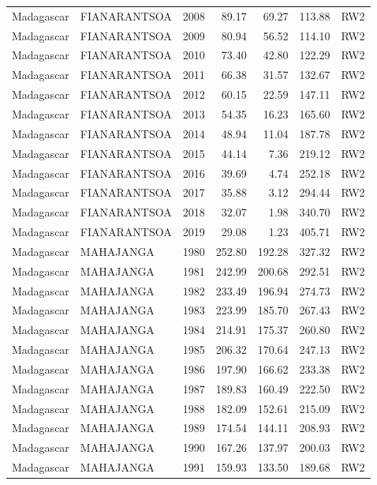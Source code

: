 \begin{longtable}{lllrrrl}
  Madagascar & FIANARANTSOA & 2008 & 89.17 & 69.27 & 113.88 & RW2 \\ 
  Madagascar & FIANARANTSOA & 2009 & 80.94 & 56.52 & 114.10 & RW2 \\ 
  Madagascar & FIANARANTSOA & 2010 & 73.40 & 42.80 & 122.29 & RW2 \\ 
  Madagascar & FIANARANTSOA & 2011 & 66.38 & 31.57 & 132.67 & RW2 \\ 
  Madagascar & FIANARANTSOA & 2012 & 60.15 & 22.59 & 147.11 & RW2 \\ 
  Madagascar & FIANARANTSOA & 2013 & 54.35 & 16.23 & 165.60 & RW2 \\ 
  Madagascar & FIANARANTSOA & 2014 & 48.94 & 11.04 & 187.78 & RW2 \\ 
  Madagascar & FIANARANTSOA & 2015 & 44.14 & 7.36 & 219.12 & RW2 \\ 
  Madagascar & FIANARANTSOA & 2016 & 39.69 & 4.74 & 252.18 & RW2 \\ 
  Madagascar & FIANARANTSOA & 2017 & 35.88 & 3.12 & 294.44 & RW2 \\ 
  Madagascar & FIANARANTSOA & 2018 & 32.07 & 1.98 & 340.70 & RW2 \\ 
  Madagascar & FIANARANTSOA & 2019 & 29.08 & 1.23 & 405.71 & RW2 \\ 
  Madagascar & MAHAJANGA & 1980 & 252.80 & 192.28 & 327.32 & RW2 \\ 
  Madagascar & MAHAJANGA & 1981 & 242.99 & 200.68 & 292.51 & RW2 \\ 
  Madagascar & MAHAJANGA & 1982 & 233.49 & 196.94 & 274.73 & RW2 \\ 
  Madagascar & MAHAJANGA & 1983 & 223.99 & 185.70 & 267.43 & RW2 \\ 
  Madagascar & MAHAJANGA & 1984 & 214.91 & 175.37 & 260.80 & RW2 \\ 
  Madagascar & MAHAJANGA & 1985 & 206.32 & 170.64 & 247.13 & RW2 \\ 
  Madagascar & MAHAJANGA & 1986 & 197.90 & 166.62 & 233.38 & RW2 \\ 
  Madagascar & MAHAJANGA & 1987 & 189.83 & 160.49 & 222.50 & RW2 \\ 
  Madagascar & MAHAJANGA & 1988 & 182.09 & 152.61 & 215.09 & RW2 \\ 
  Madagascar & MAHAJANGA & 1989 & 174.54 & 144.11 & 208.93 & RW2 \\ 
  Madagascar & MAHAJANGA & 1990 & 167.26 & 137.97 & 200.03 & RW2 \\ 
  Madagascar & MAHAJANGA & 1991 & 159.93 & 133.50 & 189.68 & RW2 \\ 

\end{longtable}
